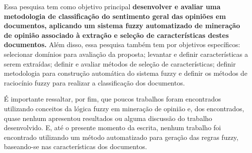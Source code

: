 \documentclass[template.tex]{subfiles}
\begin{document}

Essa pesquisa tem como objetivo principal \textbf{desenvolver e avaliar uma metodologia de classificação do sentimento geral das opiniões em documentos, aplicando um sistema fuzzy automatizado de mineração de opinião associado à extração e seleção de características destes documentos.} Além disso, essa pesquisa também tem por objetivos específicos: selecionar domínios para avaliação da proposta; levantar e definir características a serem extraídas; definir e avaliar métodos de seleção de características; definir metodologia para construção automática do sistema fuzzy e definir os métodos de raciocínio fuzzy para realizar a classificação dos documentos.
 

É importante ressaltar, por fim, que poucos trabalhos foram encontrados utilizando conceitos da lógica fuzzy em mineração de opinião e, dos encontrados, quase nenhum apresentou resultados ou alguma discussão do trabalho desenvolvido. E, até o presente momento da escrita, nenhum trabalho foi encontrado utilizando um método automatizado para geração das regras fuzzy, baseando-se nas características dos documentos. 
\end{document}
